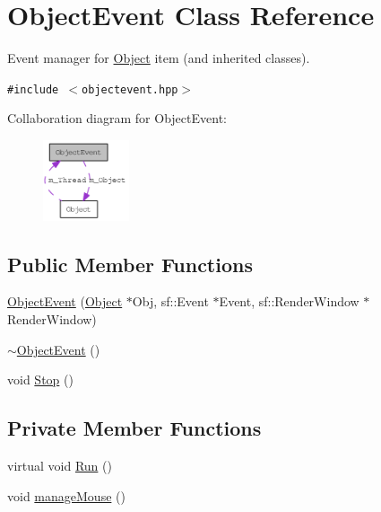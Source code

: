 \hypertarget{classObjectEvent}{
\section{ObjectEvent Class Reference}
\label{classObjectEvent}
}
Event manager for \hyperlink{classObject}{Object} item (and inherited classes).  


{\tt \#include $<$objectevent.hpp$>$}

Collaboration diagram for ObjectEvent:\nopagebreak
\begin{figure}[H]
\begin{center}
\leavevmode
\includegraphics[width=72pt]{classObjectEvent__coll__graph}
\end{center}
\end{figure}
\subsection*{Public Member Functions}
\begin{CompactItemize}
\item 
\hyperlink{classObjectEvent_1ca186fc94027fe25f106e8741a152c5}{ObjectEvent} (\hyperlink{classObject}{Object} $\ast$Obj, sf::Event $\ast$Event, sf::RenderWindow $\ast$RenderWindow)
\item 
\hyperlink{classObjectEvent_d934287161965254cb6109828987724d}{$\sim$ObjectEvent} ()
\item 
void \hyperlink{classObjectEvent_fc881fdc9cf9352370716c9240eecd4f}{Stop} ()
\end{CompactItemize}
\subsection*{Private Member Functions}
\begin{CompactItemize}
\item 
virtual void \hyperlink{classObjectEvent_5c69864ed57f567ef9cb85fae234726b}{Run} ()
\item 
void \hyperlink{classObjectEvent_c1fb2fa4a3def96157510f0828c598ac}{manageMouse} ()
\end{CompactItemize}
